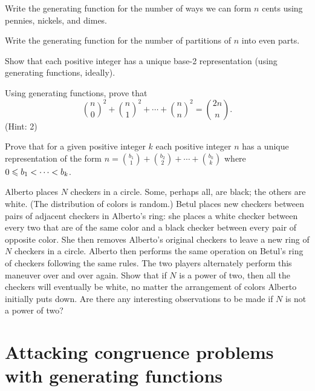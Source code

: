 \documentclass{article}
\begin{document}
\begin{exercise}
Write the generating function for the number of ways we can form \(n\) cents using pennies, nickels, and dimes.
\end{exercise}

\begin{exercise}
Write the generating function for the number of partitions of \(n\) into even parts.
\end{exercise}

\begin{exercise}
Show that each positive integer has a unique base-2 representation (using generating functions, ideally).
\end{exercise}

\begin{exercise}
Using generating functions, prove that 
\[\binom{n}{0}^2 + \binom{n}{1}^2 + \cdots + \binom{n}{n}^2 = \binom{2n}{n}.\]
(Hint: 2)
\end{exercise}

\begin{exercise}
Prove that for a given positive integer $k$ each positive integer $n$ has a unique representation of the form $n=\binom{b_1}{1}+\binom{b_2}{2}+\cdots+\binom{b_k}{k}$ where $0\leqslant b_1<\cdots< b_k$. 
\end{exercise}

\begin{exercise}
Alberto places \(N\) checkers in a circle. Some, perhaps all, are black; the others are white.
(The distribution of colors is random.) Betul places new checkers between pairs of adjacent checkers in
Alberto’s ring: she places a white checker between every two that are of the same color and a black checker
between every pair of opposite color. She then removes Alberto’s original checkers to leave a new ring of \(N\)
checkers in a circle. Alberto then performs the same operation on Betul’s ring of checkers following the same
rules. The two players alternately perform this maneuver over and over again. Show that if \(N\) is a power
of two, then all the checkers will eventually be white, no matter the arrangement of colors Alberto initially
puts down. Are there any interesting observations to be made if \(N\) is not a power of two?
\end{exercise}

\section{Attacking congruence problems with generating functions}
\end{document}
